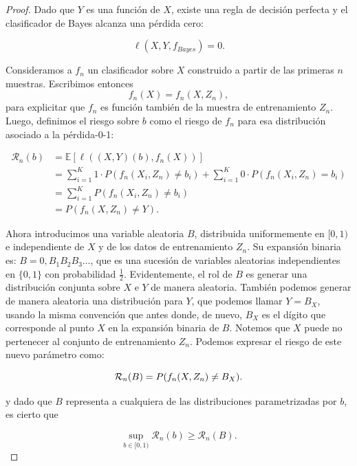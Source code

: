 \documentclass{report}
\begin{document}
\begin{proof}
Dado que \(Y\) es una función de \(X\), existe una regla de decisión perfecta y el clasificador de Bayes alcanza una pérdida cero:

\[
\ell(X,Y,f_{Bayes}) = 0.
\]

Consideramos a $f_n$ un clasificador sobre $X$ construido a partir de las primeras $n$ muestras. Escribimos entonces
\[
f_n(X) = f_n(X, Z_n),
\]
para explicitar que $f_n$ es función también de la muestra de entrenamiento $Z_n$. Luego, definimos el riesgo sobre \(b\)
como el riesgo de $f_n$ para esa distribución asociado a la pérdida-0-1:


\begin{equation*}
    \begin{aligned}
        \mathcal{R}_n(b) &= \mathbb{E}[\ell((X,Y)(b),f_n(X))]\\ 
        &= \sum_{i=1}^{K} 1 \cdot P(f_n(X_i, Z_n) \neq b_{i}) + \sum_{i=1}^{K} 0 \cdot P(f_n(X_i, Z_n) = b_{i})\\
        &= \sum_{i=1}^{K} P(f_n(X_i, Z_n) \neq b_{i}) \\
        &= P(f_n(X, Z_n) \neq Y).
    \end{aligned}
\end{equation*}


Ahora introducimos una variable aleatoria \(B\), distribuida uniformemente en \([0,1)\) e independiente de \(X\) y 
de los datos de entrenamiento \(Z_n\). Su expansión binaria es: \(B = 0,B_1B_2B_3\dots\), que es una sucesión 
de variables aleatorias independientes en \(\{0,1\}\) con probabilidad $\frac{1}{2}$. Evidentemente, el rol de $B$
es generar una distribución conjunta sobre $X$ e $Y$ de manera aleatoria. También podemos generar de manera aleatoria
una distribución para $Y$, que podemos llamar $Y=B_X$, usando la misma convención que antes donde, de nuevo,
$B_X$ es el dígito que corresponde al punto $X$ en la expansión binaria de $B$. Notemos que $X$ puede no pertenecer
al conjunto de entrenamiento $Z_n$. \newline
Podemos expresar el riesgo de este nuevo parámetro como:


\[
\mathcal{R}_n(B) = P(f_n(X, Z_n) \neq B_X).\newline
\]

y dado que $B$ representa a cualquiera de las distribuciones parametrizadas por $b$, es cierto que

\begin{equation}
    \sup_{b\in[0,1)} \mathcal{R}_n(b) \geq \mathcal{R}_n(B). \label{eq:cota_parametro_b_distribuciones}
\end{equation}




\end{proof}
\end{document}
